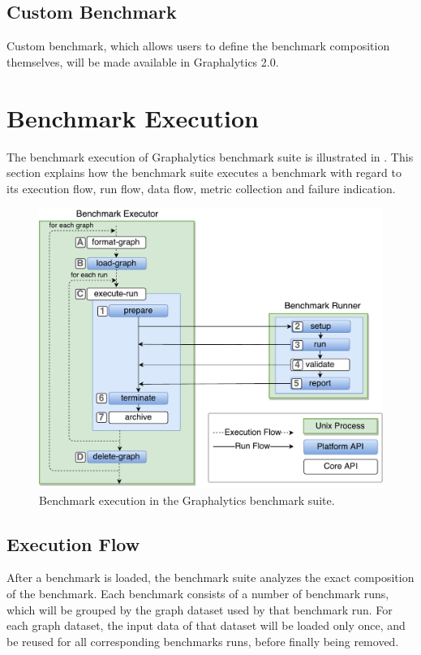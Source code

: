 \subsection{Custom Benchmark}
\label{sec:process:type:custom}
Custom benchmark, which allows users to define the benchmark composition themselves, will be made available in Graphalytics 2.0.




\section{Benchmark Execution}
\label{sec:process:execution}
The benchmark execution of Graphalytics benchmark suite is illustrated in . This section explains how the benchmark suite executes a benchmark with regard to its execution flow, run flow, data flow, metric collection and failure indication.

\begin{figure}[h]
 	\centering
 	\includegraphics[width=0.9\linewidth]{figures/benchmark_process.pdf}
 	\caption{Benchmark execution in the Graphalytics benchmark suite.}
 	\label{fig:benchmark-process}
\end{figure}


\subsection{Execution Flow}
\label{sec:process:execution:exe_flow}
After a benchmark is loaded, the benchmark suite analyzes the exact composition of the benchmark. Each benchmark consists of a number of benchmark runs, which will be grouped by the graph dataset used by that benchmark run. For each graph dataset, the input data of that dataset will be loaded only once, and be reused for all corresponding benchmarks runs, before finally being removed.


